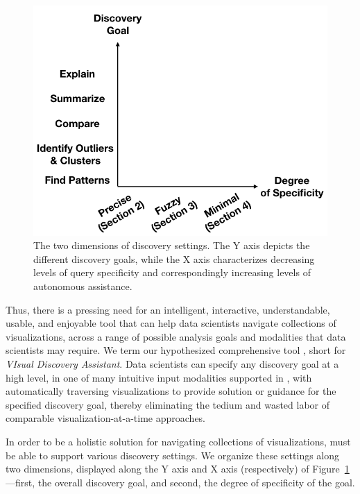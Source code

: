 \begin{figure}
\centering
\vspace{-10pt}
\includegraphics[width=\linewidth]{figures/dimensions_cropped.png}
\vspace{-15pt}
\caption{The two dimensions of discovery settings. The Y axis depicts the different discovery goals, while the X axis characterizes decreasing levels of query specificity and correspondingly increasing levels of autonomous assistance.}\label{fig:dimensions}
\vspace{-15pt}
\end{figure}


\par
Thus, there is a pressing need for an 
intelligent,
interactive, understandable, usable, and
enjoyable tool that can help 
data scientists navigate
collections of visualizations, across a range of possible analysis goals and modalities that data scientists may require.
We term our hypothesized comprehensive tool \vida,
short for {\em VIsual Discovery Assistant}.
Data scientists can specify any discovery
goal at a high level, in one of many intuitive input modalities supported in \vida, with \vida automatically traversing visualizations to provide solution or guidance for the
specified discovery goal, thereby
eliminating the tedium and wasted
labor of comparable visualization-at-a-time 
approaches.

\par
{} 
In order to be a holistic solution for 
navigating collections of visualizations,
\vida must be able to support various discovery
settings. 
We organize these settings along two
dimensions, displayed along the Y axis and 
X axis (respectively) of Figure~\ref{fig:dimensions}---first, 
the overall discovery goal,
and second, the degree of specificity of the goal.




